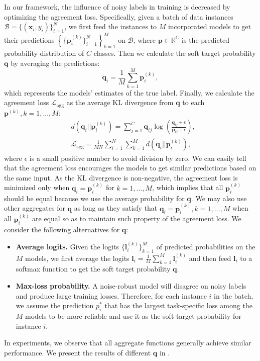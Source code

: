 \documentclass[11pt]{article}
\begin{document}
In our framework, the influence of noisy labels in training is decreased by optimizing the agreement loss.
Specifically, given a batch of data instances $\mathcal{B}=\{(\bm{x}_i, y_i)\}_{i=1}^N$, we first feed the instances to $M$ incorporated models to get their predictions $\left\{\{\bm{p}_i^{(k)}\}_{i=1}^N\right\}_{k=1}^M$ on $\mathcal{B}$, where $\bm{p}\in \mathbb{R}^C$ is the predicted probability distribution of $C$ classes.
Then we calculate the soft target probability $\bm{q}$ by averaging the predictions:
\begin{equation}\label{eq:q}
    \bm{q}_i = \frac{1}{M} \sum_{k=1}^M \bm{p}_i^{(k)},
\end{equation}
which represents the models' estimates of the true label.
Finally, we calculate the agreement loss $\mathcal{L}_\text{agg}$ as the average KL divergence from $\bm{q}$ to each $\bm{p}^{(k)}, k=1,..., M$:
\begin{align}
    &d(\bm{q}_i || \bm{p}_i^{(k)}) = \sum_{j=1}^C \bm{q}_{ij}\log\left(\frac{\bm{q}_{ij} + \epsilon}{\bm{p}_{ij} + \epsilon}\right), \label{eq:agreement1}\\
    &\mathcal{L}_\text{agg} = \frac{1}{MN} \sum_{i=1}^N \sum_{k=1}^M d(\bm{q}_i || \bm{p}_i^{(k)}), \label{eq:agreement2} \end{align}
where $\epsilon$ is a small positive number to avoid division by zero.
We can easily tell that the agreement loss encourages the models to get similar predictions based on the same input.
As the KL divergence is non-negative, the agreement loss is minimized only when $\bm{q}_i = \bm{p}_i^{(k)}$ for $k=1,...,M$, which implies that all $\bm{p}_i^{(k)}$ should be equal because we use the average probability for $\bm{q}$.
We may also use other aggregates for $\bm{q}$ as long as they satisfy that $\bm{q}_i = \bm{p}_i^{(k)}, k=1,...,M$ when all $\bm{p}_i^{(k)}$ are equal so as to maintain such property of the agreement loss.
We consider the following alternatives for $\bm{q}$:
\begin{itemize}[leftmargin=1em]
    \setlength\itemsep{0em}
    \item \textbf{Average logits.} Given the logits $\{\bm{l}_i^{(k)}\}_{k=1}^M$ of predicted probabilities on the $M$ models, we first average the logits $\bm{l}_i = \frac{1}{M} \sum_{k=1}^M \bm{l}_i^{(k)}$ and then feed $\bm{l}_i$ to a softmax function to get the soft target probability $\bm{q}$.

    \item \textbf{Max-loss probability.} A noise-robust model will disagree on noisy labels and produce large training losses.
    Therefore, for each instance $i$ in the batch, we assume the prediction $p_i^*$ that has the largest task-specific loss among the $M$ models to be more reliable and use it as the soft target probability for instance $i$.
\end{itemize}
In experiments, we observe that all aggregate functions generally achieve similar performance.
We present the results of different $\bm{q}$ in .
\end{document}
